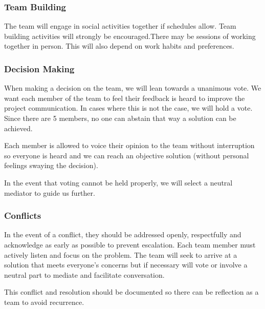 \documentclass{article}
\begin{document}
\subsubsection*{Team Building}

The team will engage in social activities together if schedules allow. Team building activities will strongly be encouraged.There may be sessions of working together in person. This will also depend on work habits and preferences.

\subsubsection*{Decision Making} 

When making a decision on the team, we will lean towards a unanimous vote. We want each member of the team to feel their feedback is heard to improve the project communication. In cases where this is not the case, we will hold a vote. Since there are 5 members, no one can abstain that way a solution can be achieved. 


Each member is allowed to voice their opinion to the team without interruption so everyone is heard and we can reach an objective solution (without personal feelings swaying the decision). 


In the event that voting cannot be held properly, we will select a neutral mediator to guide us further.

\subsubsection*{Conflicts}
In the event of a conflict, they should be addressed openly, respectfully and acknowledge as early as possible to prevent escalation. Each team member must actively listen and focus on the problem. The team will seek to arrive at a solution that meets everyone's concerns but if necessary will vote or involve a neutral part to mediate and facilitate conversation. 


This conflict and resolution should be documented so there can be reflection as a team to avoid recurrence. 
\end{document}
